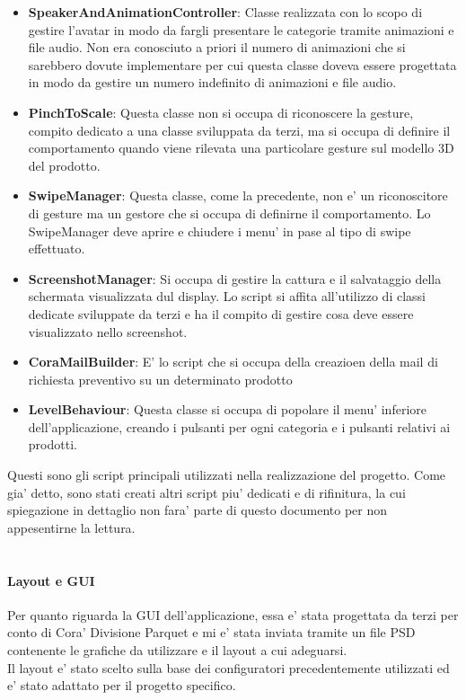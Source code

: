 \begin{itemize}
	\item \textbf{SpeakerAndAnimationController}: Classe realizzata con lo scopo di gestire l'avatar in modo da fargli presentare le categorie tramite animazioni e file audio. Non era conosciuto a priori il numero di animazioni che si sarebbero dovute implementare per cui questa classe doveva essere progettata in modo da gestire un numero indefinito di animazioni e file audio.
	
	\item \textbf{PinchToScale}: Questa classe non si occupa di riconoscere la gesture, compito dedicato a una classe sviluppata da terzi, ma si occupa di definire il comportamento quando viene rilevata una particolare gesture sul modello 3D del prodotto.
	
	\item \textbf{SwipeManager}: Questa classe, come la precedente, non e' un riconoscitore di gesture ma un gestore che si occupa di definirne il comportamento. Lo SwipeManager deve aprire e chiudere i menu' in pase al tipo di swipe effettuato.
	
	\item \textbf{ScreenshotManager}: Si occupa di gestire la cattura e il salvataggio della schermata visualizzata dul display. Lo script si affita all'utilizzo di classi dedicate sviluppate da terzi e ha il compito di gestire cosa deve essere visualizzato nello screenshot.
	
	\item \textbf{CoraMailBuilder}: E' lo script che si occupa della creazioen della mail di richiesta preventivo su un determinato prodotto
	
	\item \textbf{LevelBehaviour}: Questa classe si occupa di popolare il menu' inferiore dell'applicazione, creando i pulsanti per ogni categoria e i pulsanti relativi ai prodotti.
\end{itemize}

Questi sono gli script principali utilizzati nella realizzazione del progetto. Come gia' detto, sono stati creati altri script piu' dedicati e di rifinitura, la cui spiegazione in dettaglio non fara' parte di questo documento per non appesentirne la lettura.\\\\

\paragraph{Layout e GUI}
Per quanto riguarda la GUI dell'applicazione, essa e' stata progettata da terzi per conto di Cora' Divisione Parquet e mi e' stata inviata tramite un file PSD contenente le grafiche da utilizzare e il layout a cui adeguarsi.\\
Il layout e' stato scelto sulla base dei configuratori precedentemente utilizzati ed e' stato adattato per il progetto specifico.


